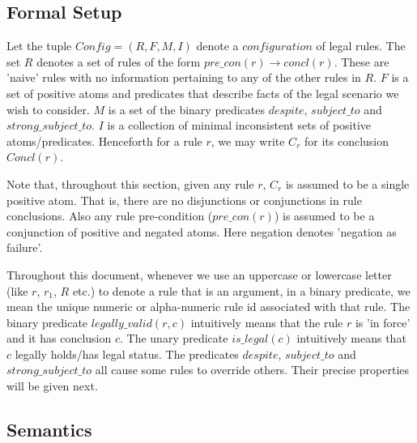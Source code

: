 \subsection{Formal Setup}
Let the tuple $Config = (R,F,M,I)$ denote a $configuration$ of legal rules. The set $R$ denotes a set of rules of the form $pre\_con(r)\rightarrow concl(r)$. These are 'naive' rules with no information pertaining to any of the other rules in $R$. $F$ is a set of positive atoms and predicates that describe facts of the legal scenario we wish to consider. $M$ is a set of the binary predicates $despite$, $subject\_to$ and $strong\_subject\_to$. $I$ is a collection of minimal inconsistent sets of positive atoms/predicates. Henceforth for a rule $r$, we may write $C_{r}$ for its conclusion $Concl(r)$. 

Note that, throughout this section, given any rule $r$, $C_{r}$ is assumed to be a single positive atom. That is, there are no disjunctions or conjunctions in rule conclusions. Also any rule pre-condition ($pre\_con(r)$) is assumed to be a conjunction of positive and negated atoms. Here negation denotes 'negation as failure'.  

Throughout this document, whenever we use an uppercase or lowercase letter (like $r$, $r_{1}$, $R$ etc.) to denote a rule that is an argument, in a binary predicate, we mean the unique numeric or alpha-numeric rule id associated with that rule. The binary predicate $legally\_valid(r,c)$ intuitively means that the rule $r$ is 'in force' and it has conclusion $c$. The unary predicate $is\_legal(c)$ intuitively means that $c$ legally holds/has legal status. The predicates $despite$, $subject\_to$ and $strong\_subject\_to$ all cause some rules to override others. Their precise properties will be given next.


\subsection{Semantics}

